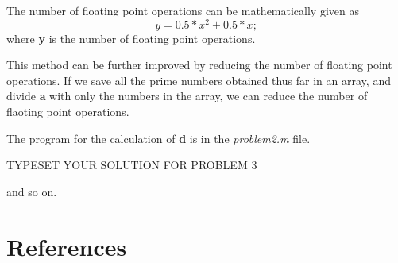 \documentclass[fleqn,letterpaper,12pt]{report}
\begin{document}
The number of floating point operations can be mathematically given as $$y = 0.5*x^2 + 0.5*x ;$$
where {\bf y} is the number of floating point operations.

This method can be further improved by reducing the number of floating point operations. If we save all the prime numbers obtained thus far in an array, and divide {\bf a} with only the numbers in the array, we can reduce the number of flaoting point operations.

The program for the calculation of {\bf d} is in the {\em problem2.m} file.
%
\newpage
{}
{}
\problem
TYPESET YOUR SOLUTION FOR PROBLEM 3

\vfill
and so on.

\newpage
{}
\section*{References}


\end{document}
